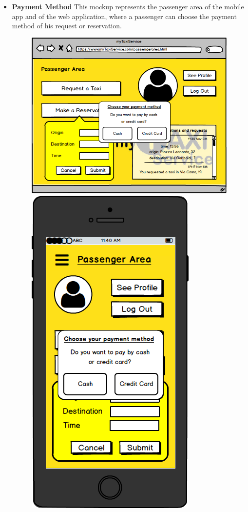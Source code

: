 \documentclass[18pt,oneside,a4paper, titlepage]{article}
\begin{document}
\begin{itemize}
\begin{figure}[h]
				\end{figure}
				\\ \\ \\
				\item \textbf{Payment Method} This mockup represents the passenger area of the mobile app and of the web application, where a passenger can choose the payment method of his request or reservation.\\
				\begin{figure}[h]
					\includegraphics[scale=0.3]{Mockups/WebAppPaymentMethod.png}%
					\qquad\qquad
					\includegraphics[scale=0.3]{Mockups/MobileAppPaymentMethod.png}

\end{figure}
\end{itemize}
\end{document}
